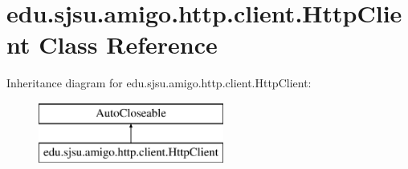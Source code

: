 \hypertarget{classedu_1_1sjsu_1_1amigo_1_1http_1_1client_1_1_http_client}{}\section{edu.\+sjsu.\+amigo.\+http.\+client.\+Http\+Client Class Reference}
\label{classedu_1_1sjsu_1_1amigo_1_1http_1_1client_1_1_http_client}
Inheritance diagram for edu.\+sjsu.\+amigo.\+http.\+client.\+Http\+Client\+:\begin{figure}[H]
\begin{center}
\leavevmode
\includegraphics[height=2.000000cm]{classedu_1_1sjsu_1_1amigo_1_1http_1_1client_1_1_http_client}
\end{center}
\end{figure}
